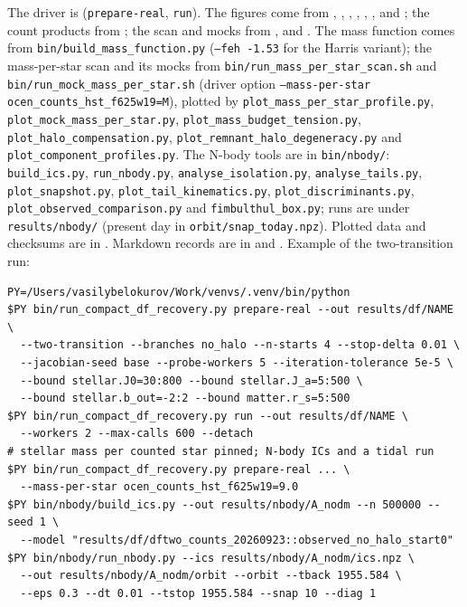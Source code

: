 \documentclass[11pt,a4paper]{article}
\begin{document}
The driver is  (\texttt{prepare-real},
\texttt{run}). The figures come from ,
, ,
, ,
,  and
; the count products from
; the scan and mocks from
,  and
. The mass function comes from
\texttt{bin/build\_mass\_function.py} (\texttt{--feh -1.53} for the Harris
variant); the mass-per-star scan and its mocks from
\texttt{bin/run\_mass\_per\_star\_scan.sh} and
\texttt{bin/run\_mock\_mass\_per\_star.sh} (driver option
\texttt{--mass-per-star ocen\_counts\_hst\_f625w19=M}), plotted by
\texttt{plot\_mass\_per\_star\_profile.py}, \texttt{plot\_mock\_mass\_per\_star.py},
\texttt{plot\_mass\_budget\_tension.py}, \texttt{plot\_halo\_compensation.py},
\texttt{plot\_remnant\_halo\_degeneracy.py} and
\texttt{plot\_component\_profiles.py}. The N-body tools are in
\texttt{bin/nbody/}: \texttt{build\_ics.py}, \texttt{run\_nbody.py},
\texttt{analyse\_isolation.py}, \texttt{analyse\_tails.py},
\texttt{plot\_snapshot.py}, \texttt{plot\_tail\_kinematics.py},
\texttt{plot\_discriminants.py}, \texttt{plot\_observed\_comparison.py} and
\texttt{fimbulthul\_box.py}; runs are under \texttt{results/nbody/} (present
day in \texttt{orbit/snap\_today.npz}). Plotted data and checksums are in
. Markdown records are in
 and
. Example of the two-transition
run:
\begin{verbatim}
PY=/Users/vasilybelokurov/Work/venvs/.venv/bin/python
$PY bin/run_compact_df_recovery.py prepare-real --out results/df/NAME \
  --two-transition --branches no_halo --n-starts 4 --stop-delta 0.01 \
  --jacobian-seed base --probe-workers 5 --iteration-tolerance 5e-5 \
  --bound stellar.J0=30:800 --bound stellar.J_a=5:500 \
  --bound stellar.b_out=-2:2 --bound matter.r_s=5:500
$PY bin/run_compact_df_recovery.py run --out results/df/NAME \
  --workers 2 --max-calls 600 --detach
# stellar mass per counted star pinned; N-body ICs and a tidal run
$PY bin/run_compact_df_recovery.py prepare-real ... \
  --mass-per-star ocen_counts_hst_f625w19=9.0
$PY bin/nbody/build_ics.py --out results/nbody/A_nodm --n 500000 --seed 1 \
  --model "results/df/dftwo_counts_20260923::observed_no_halo_start0"
$PY bin/nbody/run_nbody.py --ics results/nbody/A_nodm/ics.npz \
  --out results/nbody/A_nodm/orbit --orbit --tback 1955.584 \
  --eps 0.3 --dt 0.01 --tstop 1955.584 --snap 10 --diag 1
\end{verbatim}



\end{document}
